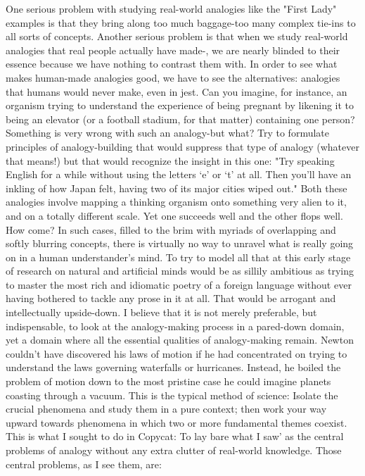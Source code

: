         One serious problem with studying real-world analogies like the "First Lady"
examples is that they bring along too much baggage-too many complex tie-ins to all
sorts of concepts. Another serious problem is that when we study real-world analogies
that real people actually have made-, we are nearly blinded to their essence because
we have nothing to contrast them with. In order to see what makes human-made
analogies good, we have to see the alternatives: analogies that humans would never
make, even in jest. Can you imagine, for instance, an organism trying to understand
the experience of being pregnant by likening it to being an elevator (or a football
stadium, for that matter) containing one person? Something is very wrong with such
an analogy-but what? Try to formulate principles of analogy-building that would
suppress that type of analogy (whatever that means!) but that would recognize the
insight in this one: "Try speaking English for a while without using the letters `e' or `t'
at all. Then you'll have an inkling of how Japan felt, having two of its major cities
wiped out." Both these analogies involve mapping a thinking organism onto
something very alien to it, and on a totally different scale. Yet one succeeds well and
the other flops well. How come?
        In such cases, filled to the brim with myriads of overlapping and softly
blurring concepts, there is virtually no way to unravel what is really going on in a
human understander's mind. To try to model all that at this early stage of research on
natural and artificial minds would be as sillily ambitious as trying to master the most
rich and idiomatic poetry of a foreign language without ever having bothered to tackle
any prose in it at all. That would be arrogant and intellectually upside-down.
        I believe that it is not merely preferable, but indispensable, to look at the
analogy-making process in a pared-down domain, yet a domain where all the essential
qualities of analogy-making remain. Newton couldn't have discovered his laws of
motion if he had concentrated on trying to understand the laws governing waterfalls
or hurricanes. Instead, he boiled the problem of motion down to the most pristine case
he could imagine planets coasting through a vacuum. This is the typical method of
science: Isolate the crucial phenomena and study them in a pure context; then work
your way upward towards phenomena in which two or more fundamental themes
coexist.
This is what I sought to do in Copycat: To lay bare what I saw' as the central
problems of analogy without any extra clutter of real-world knowledge. Those central
problems, as I see them, are:




